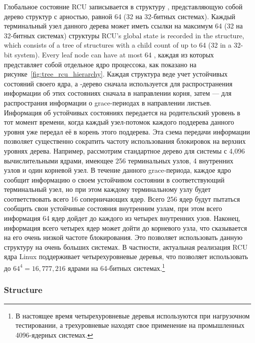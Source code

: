 Глобальное состояние RCU записывается в структуру ,
представляющую собой дерево структур  с арностью, равной 64
(32 на 32-битных системах). Каждый терминальный узел данного дерева
может иметь ссылки на максимум 64 (32 на 32-битных системах) структуры
RCU's global state is recorded in the  structure, which consists of
a tree of  structures with a child count of up to 64
(32 in a 32-bit system). Every leaf node can have at most 64 ,
каждая из которых представляет собой отдельное ядро процессока,
как показано на рисунке~\ref{fig:tree_rcu_hierarchy}.
%
Каждая структура  веде учет устойчивых состояний своего ядра,
а -дерево сначала используется для распространения информации
об этих состояниях сначала в направлении корня,
затем --- для распространия информации о grace-периодах в направлении листьев.
%
Информация об устойчивых состояниях передается на родительский уровень
в тот момент времени, когда каждый узел-потомок каждого поддерева данного уровня
уже передал её в корень этого поддерева.
Эта сзема передачи информации позволяет существенно сократить частоту использования
блокировок на верхних уровнях дерева.
%
Например, рассмотрим стандартное  дерево для системы с
4{,}096 вычислительными ядрами, имеющее 256 терминальных узлов,
4 внутренних узлов и один корневой узел. В течение данного grace-периода,
каждое ядро сообщит информацию о своем устойчивом состоянии в
соответствующий терминальный узел, но при этом каждому терминальному узлу
будет соответствовать всего 16 соперничающих ядер.
Всего 256 ядер будут пытаться сообщить свои устойчивые состояния внутренним узлам,
при этом всего информация 64 ядер дойдет до каждого из четырех внутренних узов.
Наконец, информация всего четырех ядер может дойти до корневого узла,
что сказывается на его очень низкой частоте блокирования.
Это позволяет использовать данную структуру на очень больших системах.
В частности, актуальная реализация RCU ядра Linux поддерживает
четырехуровневые деревья, что позволяет использовать до
$64^4 = 16{,}777{,}216$ ядрами на 64-битных системах.\footnote{
  В настоящее время четырехуровневые деревья используются при нагрузочном тестировании,
  а трехуровневые находят свое применение на промышленных 4096-ядерных системах.}

\subsubsection{ Structure}

